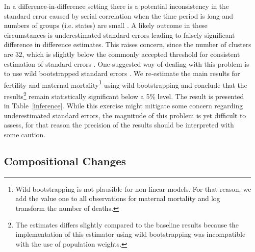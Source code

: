 \documentclass[a4paper, 11pt]{article}
\begin{document}
\begin{spacing}{2}
In a difference-in-difference setting there is a potential inconsistency in the standard error caused by serial correlation when the time period is long and numbers of groups (i.e. states) are small \citep{Bertrand2002}. A likely outcome in these circumstances is underestimated standard errors leading to falsely significant difference in difference estimates. This raises concern, since the number of clusters are 32, which is slightly below the commonly accepted threshold for consistent estimation of standard errors \citep{angrist_mostly_2009}. One suggested way of dealing with this problem is to use wild bootstrapped standard errors \citep{Bertrand2002}. We re-estimate the main results for fertility and maternal mortality\footnote{Wild bootstrapping is not plausible for non-linear models. For that reason, we add the value one to all observations for maternal mortality and log transform the number of deaths.} using wild bootstrapping and conclude that the results\footnote{The estimates differs slightly compared to the baseline results because the implementation of this estimator using wild bootstrapping was incompatible with the use of population weights.} remain statistically significant below a 5\% level. The result is presented in Table~\ref{inference}. While this exercise might mitigate some concern regarding underestimated standard errors, the magnitude of this problem is yet difficult to assess, for that reason the precision of the results should be interpreted with some caution.    


\subsection{Compositional Changes}\label{CompositionalChanges}


\end{spacing}
\end{document}
